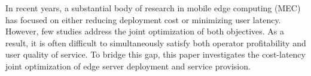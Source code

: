 \documentclass[10pt, conference, letterpaper]{IEEEtran}
\begin{document}
In recent years, a substantial body of research in mobile edge computing (MEC) has focused on either reducing deployment cost or minimizing user latency. However, few studies address the joint optimization of both objectives. As a result, it is often difficult to simultaneously satisfy both operator profitability and user quality of service. To bridge this gap, this paper investigates the cost-latency joint optimization of edge server deployment and service provision.
\end{document}
